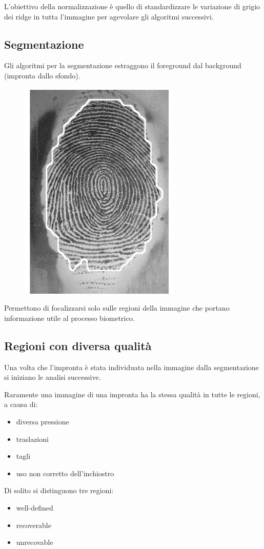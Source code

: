 \documentclass{report}
\begin{document}
L’obiettivo della normalizzazione è quello di standardizzare le
variazione di grigio dei ridge in tutta l’immagine per agevolare
gli algoritmi successivi.

\subsection{Segmentazione}

Gli algoritmi per la segmentazione estraggono il foreground
dal background (impronta dallo sfondo).

\begin{figure}[ht]
    \centering
    \includegraphics[width=0.3\linewidth]{images/segmentazione.png}
\end{figure}

\noindent Permettono di focalizzarsi solo sulle regioni della immagine che 
portano informazione utile al processo biometrico.

\subsection{Regioni con diversa qualità}

\noindent Una volta che l’impronta è stata individuata nella immagine
dalla segmentazione si iniziano le analisi successive.

\noindent Raramente una immagine di una impronta ha la stessa qualità
in tutte le regioni, a causa di:

\begin{itemize}
    \item diversa pressione
    \item traslazioni
    \item tagli
    \item uso non corretto dell'inchiostro
\end{itemize}

\noindent Di solito si distinguono tre regioni:
\begin{itemize}
    \item well-defined
    \item recoverable
    \item unrecovable
\end{itemize}
\end{document}
